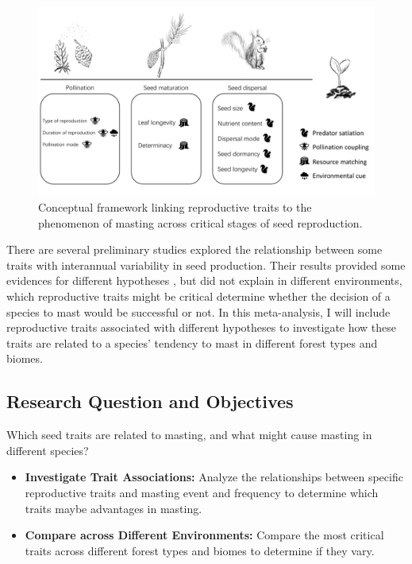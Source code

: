 \documentclass[11pt,letter]{article}
\begin{document}
\begin{figure}[htb]
	\centering
	\includegraphics[width=1\linewidth]{conceptualChap1.png}
	\caption{Conceptual framework linking reproductive traits to the phenomenon of masting across critical stages of seed reproduction.}
	\label{fig:conceptual1}
\end{figure}
There are several preliminary studies explored the relationship between some traits with interannual variability in seed production. Their results provided some evidences for different hypotheses \citep{journe2023evolution, fernandez2019nutrient, pearse2020biogeography}, but did not explain in different environments, which reproductive traits might be critical determine whether the decision of a species to mast would be successful or not. In this meta-analysis, I will include reproductive traits associated with different hypotheses to investigate how these traits are related to a species' tendency to mast in different forest types and biomes.\par

\subsection{Research Question and Objectives}
Which seed traits are related to masting, and what might cause masting in different species?
	\begin{itemize}
	\item \textbf{Investigate Trait Associations:} Analyze the relationships between specific reproductive traits and masting event and frequency to determine which traits maybe advantages in masting.
	\item \textbf{Compare across Different Environments:} Compare the most critical traits across different forest types and biomes to determine if they vary.
	\end{itemize}
\end{document}
